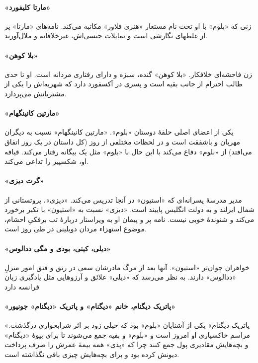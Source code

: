 \documentclass[12pt]{book}
\newcommand{\noun}[1]{«{#1}»}
\begin{document}
    \paragraph{\noun{مارتا کلیفورد}\protect{}}
    زنی که \noun{بلوم} با او تحت نام مستعار \noun{هنری فلاور} مکاتبه می‌کند. نامه‌های \noun{مارتا} پر از غلطهای نگارشی است و تمایلات جنسی‌اش، غیرخلاقانه و ملال‌آورند.
    \paragraph{\noun{بلا کوهن}\protect{}}
    زن فاحشه‌ای خلافکار. \noun{بلا کوهن} گنده، سبزه و دارای رفتاری مردانه است. او تا حدی طالب احترام از جانب بقیه است و پسری در آکسفورد دارد که شهریه‌اش را یکی از مشتریانش می‌پردازد.
    \paragraph{\noun{مارتین کانینگهام}\protect{}}
    یکی از اعضای اصلی حلقۀ دوستان \noun{بلوم}. \noun{مارتین کانینگهام}  نسبت به دیگران مهربان و باشفقت است و در لحظات مختلفی از روز (کل داستان در یک روز اتفاق می‌افتد) از \noun{بلوم} دفاع می‌کند با این حال با \noun{بلوم} مثل یک بیگانه رفتار می‌کند. قیافه او، شکسپیر را تداعی می‌کند.
    \paragraph{\noun{گرت دیزی}\protect{}}
    مدیر مدرسۀ پسرانه‌ای که \noun{استیون} در آنجا تدریس می‌کند. \noun{دیزی}، پروتستانی از شمال ایرلند و به دولت انگلیس پایبند است. \noun{دیزی} نسبت به \noun{استیون} با تکبر برخورد می‌کند و شنوندۀ خوبی نیست. نامه پر و پیمان او به ویراستار دربارۀ تب برفکیِ احشام، موضوع استهزاء مردان دوبلینی در طی روز است.
    \paragraph{\noun{دیلی، کیتی، بودی و مگی ددالوس}\protect{}}
    خواهران جوان‌تر \noun{استیون}. آنها بعد از مرگ مادرشان سعی در رتق و فتق امور منزلِ \noun{ددالوس} دارند. به نظر می‌رسد که \noun{دیلی} علائق و آرزوهایی مثل یادگیری زبان فرانسه دارد
    \paragraph{\noun{پاتریک دیگنام، خانم \noun{دیگنام} و پاتریک \noun{دیگنام} جونیور}\protect{}}
    \noun{پاتریک دیگنام} یکی از آشنایان \noun{بلوم} بود که خیلی زود بر اثر شرابخواری درگذشت. مراسم خاکسپاری او امروز است و \noun{بلوم} و بقیه جمع می‌شوند تا برای بیوۀ \noun{دیگنام} و بچه‌هایش مقادیری پول جمع کنند چرا که \noun{پدی} همه بیمۀ عمرش را صرف پرداخت دیونش کرده بود و برای بچه‌هایش چیزی باقی نگذاشته است.
\end{document}

